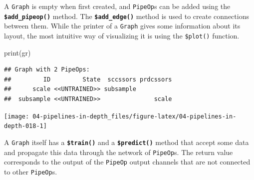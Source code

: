 \documentclass[
]{scrbook}
\newenvironment{Shaded}{\begin{snugshade}}{\end{snugshade}}
\newcommand{\AttributeTok}[1]{\textcolor[rgb]{0.77,0.63,0.00}{#1}}
\newcommand{\ConstantTok}[1]{\textcolor[rgb]{0.00,0.00,0.00}{#1}}
\newcommand{\FloatTok}[1]{\textcolor[rgb]{0.00,0.00,0.81}{#1}}
\newcommand{\FunctionTok}[1]{\textcolor[rgb]{0.00,0.00,0.00}{#1}}
\newcommand{\NormalTok}[1]{#1}
\newcommand{\OtherTok}[1]{\textcolor[rgb]{0.56,0.35,0.01}{#1}}
\newcommand{\SpecialCharTok}[1]{\textcolor[rgb]{0.00,0.00,0.00}{#1}}
\newcommand{\StringTok}[1]{\textcolor[rgb]{0.31,0.60,0.02}{#1}}
\renewenvironment{Shaded} {\begin{snugshade}\small} {\end{snugshade}}
\begin{document}
A \texttt{Graph} is empty when first created, and \texttt{PipeOp}s can be added using the \textbf{\texttt{\$add\_pipeop()}} method.
The \textbf{\texttt{\$add\_edge()}} method is used to create connections between them.
While the printer of a \texttt{Graph} gives some information about its layout, the most intuitive way of visualizing it is using the \texttt{\$plot()} function.

\begin{Shaded}
\end{Shaded}

\begin{Shaded}
\begin{Highlighting}[]
\FunctionTok{print}\NormalTok{(gr)}
\end{Highlighting}
\end{Shaded}

\begin{verbatim}
## Graph with 2 PipeOps:
##         ID         State  sccssors prdcssors
##      scale <<UNTRAINED>> subsample          
##  subsample <<UNTRAINED>>               scale
\end{verbatim}

\begin{Shaded}
\end{Shaded}

\begin{center}\texttt{[image: 04-pipelines-in-depth\_files/figure-latex/04-pipelines-in-depth-018-1]} \end{center}

A \texttt{Graph} itself has a \textbf{\texttt{\$train()}} and a \textbf{\texttt{\$predict()}} method that accept some data and propagate this data through the network of \texttt{PipeOp}s.
The return value corresponds to the output of the \texttt{PipeOp} output channels that are not connected to other \texttt{PipeOp}s.
\end{document}
